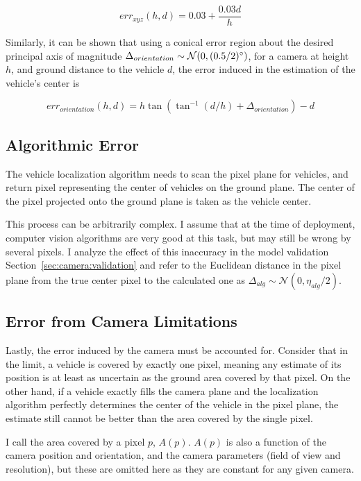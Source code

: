 \documentclass[a4paper,12pt,twoside,openright]{report}
\begin{document}
\[ err_{xyz}(h, d) = 0.03 + \frac{0.03d}{h} \]

Similarly, it can be shown that using a conical error region about the desired principal axis
of magnitude $\Delta_{orientation} \sim \mathcal{N}(0,(0.5/2)\degree)$, 
for a camera at height $h$, and ground distance to the vehicle $d$, the
error induced in the estimation of the vehicle's center is 

\[ err_{orientation}(h, d) = h\tan(\tan^{-1}(d/h) + \Delta_{orientation}) - d \] %




\subsection{Algorithmic Error}

The vehicle localization algorithm needs to scan the pixel plane for vehicles,
and return pixel representing the center of vehicles on the ground plane.
The center of the pixel projected onto the ground plane is taken as the vehicle center.

This process can be arbitrarily complex. I assume that at the time of deployment, 
computer vision algorithms are very good at this task, but may still
be wrong by several pixels. I analyze the effect of this inaccuracy
in the model validation Section~\ref{sec:camera:validation} and refer to the Euclidean distance
in the pixel plane from the true center pixel to the calculated one
as $\Delta_{alg} \sim \mathcal{N}(0, \eta_{alg}/2)$.

\subsection{Error from Camera Limitations}

Lastly, the error induced by the camera must be accounted for. Consider that 
in the limit, a vehicle is covered by exactly one pixel, meaning any estimate
of its position is at least as uncertain as the ground area 
covered by that pixel. On the other hand, if a vehicle
exactly fills the camera plane and the localization algorithm perfectly determines
the center of the vehicle in the pixel plane, the estimate still cannot
be better than the area covered by the single pixel.

I call the area covered by a pixel $p$, $A(p)$. $A(p)$ is also a function of the camera
position and orientation, and the camera parameters (field of view and resolution),
but these are omitted here as they are constant for any given camera.
\end{document}
